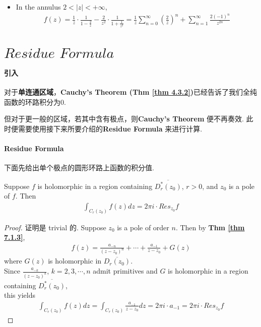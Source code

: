 \begin{enumerate}
\begin{solution}
\begin{itemize}
			\vspace{1em}
			
			\item In the annulus $2 < \left| z \right| < +\infty$,
			\begin{align}
				f(z) 
				= \frac{1}{z} \cdot \frac{1}{1 - \frac{2}{z}} - \frac{2}{z^2} \cdot \frac{1}{1 + \frac{1}{z^2}}
				= \frac{1}{z} \sum_{n = 0}^{\infty}{\left( \frac{2}{z} \right)^n} + \sum_{n = 1}^{\infty}{\frac{2(-1)^n}{z^{2n}}}
			\end{align}
		\end{itemize}
	\end{solution}
\end{enumerate}

\newpage

\section{$Residue \,\, Formula$}
\paragraph{引入}
对于\textbf{单连通区域}，\textbf{Cauchy's Theorem (Thm \ref{thm 4.3.2})}已经告诉了我们全纯函数的环路积分为0. 

但对于更一般的区域，若其中含有极点，则\textbf{Cauchy's Theorem} 便不再奏效. 此时便需要使用接下来所要介绍的\textbf{Residue Formula} 来进行计算.

\vspace{2em}
\paragraph{\textbf{Residue Formula}}
下面先给出单个极点的圆形环路上函数的积分值.
\begin{thm}\label{thm 7.4.1}
	Suppose $f$ is holomorphic in a region containing $\overline{D_{r}^{*}(z_0)}$, $r > 0$, and $z_0$ is a pole of $f$. Then
	\begin{align}
		\int_{C_{r}(z_0)}{f(z) dz} = 2 \pi i \cdot Res_{z_0}f
	\end{align}
	
	\vspace{2em}
	\begin{proof}
		证明是 trivial 的. Suppose $z_0$ is a pole of order $n$. Then by \textbf{Thm \ref{thm 7.1.3}},
		\begin{align}
			f(z) = \frac{a_{-n}}{(z - z_0)^n} + \cdots + \frac{a_{-1}}{z - z_0} + G(z)
		\end{align}
		where $G(z)$ is holomorphic in $\overline{D_{r}(z_0)}$.\\
		Since $\frac{a_{-k}}{(z - z_0)^k}$,  $k = 2 , 3 , \cdots , n$ admit primitives and $G$ is holomorphic in a region containing $\overline{D_{r}^{*}(z_0)}$,\\
		this yields
		\begin{align}
			\int_{C_{r}(z_0)}{f(z) dz} = \int_{C_{r}(z_0)}{\frac{a_{-1}}{z - z_0} dz} = 2 \pi i \cdot a_{-1} = 2 \pi i \cdot Res_{z_0}f
		\end{align}
	\end{proof}
\end{thm}

